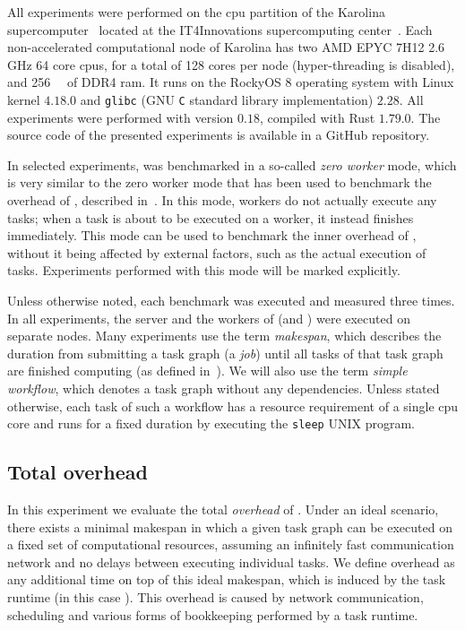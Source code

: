 All experiments were performed on the \gls{cpu} partition of the Karolina
supercomputer~\cite{karolina} located at the IT4Innovations supercomputing
center~\cite{it4i}. Each non-accelerated computational node of Karolina has two AMD
EPYC\texttrademark{} 7H12 2.6 GHz 64 core \glspl{cpu}, for a total of 128 cores
per node (hyper-threading is disabled), and \SI{256}{\gibi\byte} of DDR4
\gls{ram}. It runs on the RockyOS 8 operating system with Linux kernel
$4.18.0$ and \texttt{glibc} (GNU \texttt{C} standard library implementation) $2.28$. All experiments were
performed with \hyperqueue{} version $0.18$, compiled with Rust
$1.79.0$. The source code of the presented experiments is available in
a GitHub repository.

In selected experiments, \hq{} was benchmarked in a so-called
\emph{zero worker} mode, which is very similar to the zero worker mode that has been used to
benchmark the overhead of \rsds{}, described in~. In this
mode, workers do not actually execute any tasks; when a task is about to be executed on a worker,
it instead finishes immediately. This mode can be used to benchmark the inner overhead of
\hyperqueue{}, without it being affected by external factors, such as the actual
execution of tasks. Experiments performed with this mode will be marked explicitly.

Unless otherwise noted, each benchmark was executed and measured three times. In all experiments,
the server and the workers of \hyperqueue{} (and \dask{}) were executed on separate nodes. Many
experiments use the term \emph{makespan}, which describes the duration from submitting a
task graph (a \hyperqueue{} \emph{job}) until all tasks of that task graph
are finished computing (as defined in~). We will also use the term
\emph{simple workflow}, which denotes a task graph without any dependencies. Unless stated
otherwise, each task of such a workflow has a resource requirement of a single
\gls{cpu} core and runs for a fixed duration by executing the \texttt{sleep}
UNIX program.

\subsection{Total overhead}
\label{sec:hq-exp-total-overhead}
In this experiment we evaluate the total \emph{overhead} of \hyperqueue{}. Under
an ideal scenario, there exists a minimal makespan in which a given task graph can be executed on a
fixed set of computational resources, assuming an infinitely fast communication network and no
delays between executing individual tasks. We define overhead as any additional time on top of this
ideal makespan, which is induced by the task runtime (in this case \hyperqueue{}). This
overhead is caused by network communication, scheduling and various forms of bookkeeping
performed by a task runtime.

